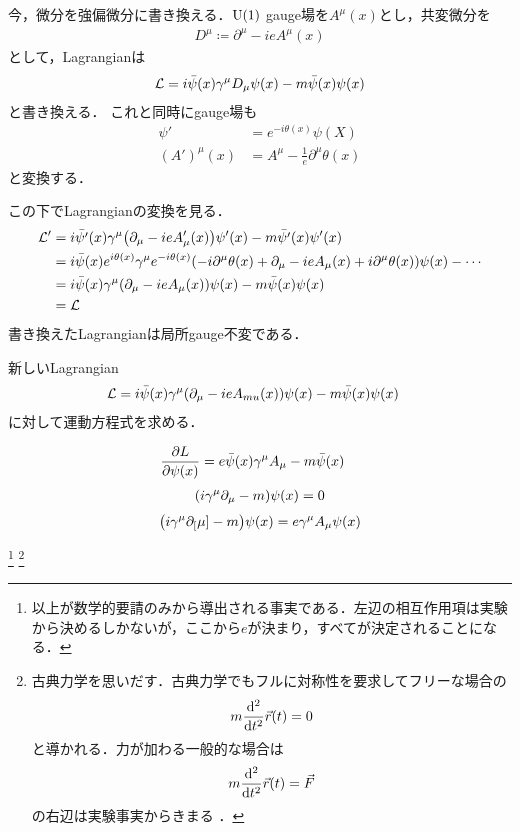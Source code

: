 	今，微分を強偏微分に書き換える．$\mathrm{U}(1)$ gauge場を$A^{\mu}(x)$とし，共変微分を
	\begin{align}
			D^{\mu} \coloneqq \partial^{\mu} - ie A^{\mu}(x)
	\end{align}
	として，Lagrangianは
	\begin{align}
			\mathcal{L} = i\bar{\psi}(x)\gamma^{\mu}D_{\mu}\psi(x) - m\bar{\psi}(x)\psi(x)
	\end{align}
	と書き換える．
	これと同時にgauge場も
	\begin{align}
			\psi' &= e^{-i\theta(x)}\psi(X)\\
			(A')^{\mu}(x) &= A^{\mu} - \frac{1}{e}\partial^{\mu}\theta(x)
	\end{align}
	と変換する．

	この下でLagrangianの変換を見る．
	\begin{align}
			\mathcal{L}'
			&= i\bar{\psi'}(x) \gamma^{\mu}\qty(\partial_{\mu} - ieA'_{\mu}(x))\psi'(x) - m\bar{\psi'}(x)\psi'(x)\\
			&= i\bar{\psi}(x)e^{i\theta(x)}\gamma^{\mu}e^{-i\theta(x)}\qty(-i\partial^{\mu}\theta(x) + \partial_{\mu} - ieA_{\mu}(x) + i\partial^{\mu}\theta(x))\psi(x) - \cdots \\
			&= i\bar{\psi}(x)\gamma^{\mu}\qty(\partial_{\mu} - ieA_{\mu}(x))\psi(x) - m\bar{\psi}(x)\psi(x)\\
			&= \mathcal{L}
	\end{align}
	書き換えたLagrangianは局所gauge不変である．

	新しいLagrangian
	\begin{align}
			\mathcal{L}
			&= i\bar{\psi}(x)\gamma^{\mu}\qty(\partial_{\mu} - ieA_{mu}(x))\psi(x) - m\bar{\psi}(x)\psi(x)
	\end{align}
	に対して運動方程式を求める．

	\begin{align}
			\pdv{L}{\psi(x)} &= e\bar{\psi}(x)\gamma^{\mu}A_{\mu} - m\bar{\psi}(x)
	\end{align}
	\begin{align}
			\qty(i\gamma^{\mu}\partial_{\mu} - m)\psi(x) = 0
	\end{align}
	\begin{align}
			\qty(i\gamma^{\mu}\partial_[\mu] - m)\psi(x) = e\gamma^{\mu}A_{\mu}\psi(x)
	\end{align}

	\footnote{以上が数学的要請のみから導出される事実である．左辺の相互作用項は実験から決めるしかないが，ここから$e$が決まり，すべてが決定されることになる．}
	\footnote{古典力学を思いだす．古典力学でもフルに対称性を要求してフリーな場合の
	\begin{align}
			m\dv[2]{}{t}\vec{r}(t) = 0
	\end{align}
	と導かれる．力が加わる一般的な場合は
	\begin{align}
			m\dv[2]{}{t}\vec{r}(t) = \vec{F}
	\end{align}
	の右辺は実験事実からきまる ．
	}

